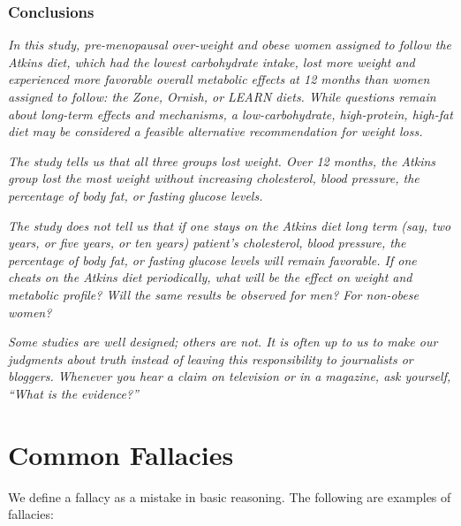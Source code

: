 \documentclass[11pt]{book}\usepackage[]{graphicx}\usepackage[]{color}
\begin{document}
\subsubsection{Conclusions}

\textit{In this study, pre-menopausal over-weight and obese women assigned to follow the Atkins diet, which had the lowest carbohydrate intake, lost more weight and experienced more favorable overall metabolic effects at 12 months than women assigned to follow: the Zone, Ornish, or LEARN diets. While questions remain about long-term effects and mechanisms, a low-carbohydrate, high-protein, high-fat diet may be considered a feasible alternative recommendation for weight loss.}

\textit{The study tells us that all three groups lost weight.  Over 12 months, the Atkins group lost the most weight without increasing cholesterol, blood pressure, the percentage of body fat, or fasting glucose levels.}

\textit{The study does not tell us that if one stays on the Atkins diet long term (say, two years, or five years, or ten years) patient's cholesterol, blood pressure, the percentage of body fat, or fasting glucose levels will remain favorable.  If one cheats on the Atkins diet periodically, what will be the effect on weight and metabolic profile?  Will the same results be observed for men?  For non-obese women?}

\textit{Some studies are well designed; others are not.  It is often up to us to make our judgments about truth instead of leaving this responsibility to journalists or bloggers.  Whenever you hear a claim on television or in a magazine, ask yourself, ``What is the evidence?''}

\section{Common Fallacies}

We define a fallacy as a mistake in basic reasoning. The following are examples of fallacies:
\end{document}

